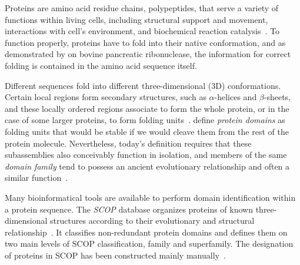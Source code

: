 \label{intro}

\label{intro:prodoms}

  Proteins are amino acid residue chains, polypeptides, that serve a variety of functions
  within living cells, including structural support and movement, interactions with cell's
  environment, and biochemical reaction catalysis~\cite{alberts2018molecular}.
  To function properly, proteins have to fold into their native conformation, and as
  demonstrated by \citet{anfinsen1961kinetics} on bovine pancreatic ribonuclease, the
  information for correct folding is contained in the amino acid sequence itself.

  Different sequences fold into different three-dimensional (3D) conformations.
  Certain local regions form secondary structures, such as $\alpha$-helices and
  $\beta$-sheets, and these locally ordered regions associate to form the whole protein,
  or in the case of some larger proteins, to form folding units~\cite{levitt1975computer}.
   define \emph{protein domains} as
  folding units that would be stable if we would cleave them from the rest of the protein
  molecule.
  Nevertheless, today's definition requires that these subassemblies also conceivably
  function in isolation, and members of the same \emph{domain family} tend to possess an
  ancient evolutionary relationship and often a similar
  function~\cite{ponting2002natural}.

  Many bioinformatical tools are available to perform domain identification within a
  protein sequence.
  The \emph{SCOP} database organizes proteins of known three-dimensional structures
  according to their evolutionary and structural relationship~\cite{murzin1995scop}.
  It classifies non-redundant protein domains and defines them on two main levels of SCOP
  classification, family and superfamily.
  The designation of proteins in SCOP has been constructed mainly
  manually~\cite{andreeva2020scop}.

